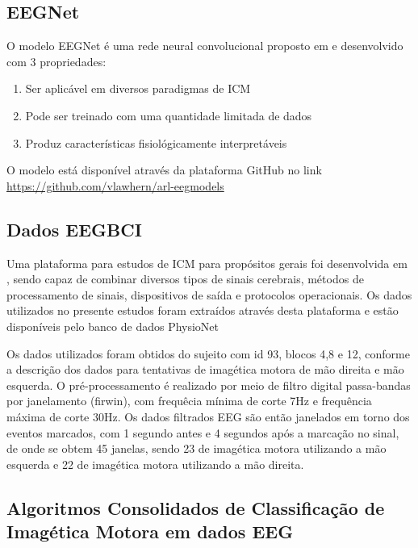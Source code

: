 \documentclass[conference,compsoc]{IEEEtran}
\begin{document}
\subsection{EEGNet}

O modelo EEGNet é uma rede neural convolucional proposto em \cite{lawhern2018eegnet} e desenvolvido com 3 propriedades:

\begin{enumerate}
    \item Ser aplicável em diversos paradigmas de ICM 
    \item Pode ser treinado com uma quantidade limitada de dados
    \item Produz características fisiológicamente interpretáveis
\end{enumerate}

O modelo está disponível através da plataforma GitHub no link \url{https://github.com/vlawhern/arl-eegmodels} 

\subsection{Dados EEGBCI}

Uma plataforma para estudos de ICM para propósitos gerais foi desenvolvida em \cite{schalk2004bci2000}, sendo capaz de combinar diversos tipos de sinais cerebrais, métodos de processamento de sinais, dispositivos de saída e protocolos operacionais. Os dados utilizados no presente estudos foram extraídos através desta plataforma e estão disponíveis pelo banco de dados PhysioNet \cite{goldberger2000physiobank}

Os dados utilizados foram obtidos do sujeito com id 93, blocos 4,8 e 12, conforme a descrição dos dados para tentativas de imagética motora de mão direita e mão esquerda. O pré-processamento é realizado por meio de filtro digital passa-bandas por janelamento (firwin), com frequêcia mínima de corte 7Hz e frequência máxima de corte 30Hz. Os dados filtrados EEG são então janelados em torno dos eventos marcados, com 1 segundo antes e 4 segundos após a marcação no sinal, de onde se obtem 45 janelas, sendo 23 de imagética motora utilizando a mão esquerda e 22 de imagética motora utilizando a mão direita.

\subsection{Algoritmos Consolidados de Classificação de Imagética Motora em dados EEG}
\end{document}

